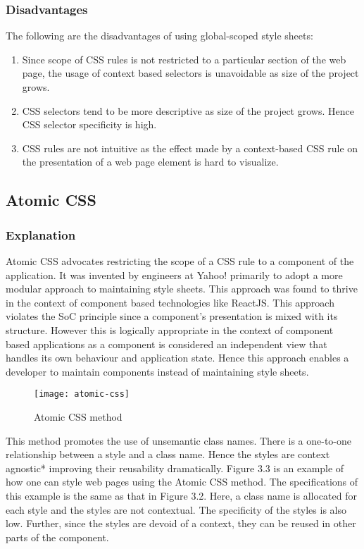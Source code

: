 \documentclass[12pt]{article}
\begin{document}
\subsubsection{Disadvantages}
The following are the disadvantages of using global-scoped style sheets:
\begin{enumerate}
	\item Since scope of CSS rules is not restricted to a particular section of the web page, the usage of context based selectors is unavoidable as size of the project grows.

	\item CSS selectors tend to be more descriptive as size of the project grows. Hence CSS selector specificity is high.

	\item CSS rules are not intuitive as the effect made by a context-based CSS rule on the presentation of a web page element is hard to visualize.
\end{enumerate}

\subsection{Atomic CSS}
\subsubsection{Explanation}
Atomic CSS advocates restricting the scope of a CSS rule to a component of the application. It was invented by engineers at Yahoo! primarily to adopt a more modular approach to maintaining style sheets. This approach was found to thrive in the context of component based technologies like ReactJS. This approach violates the SoC principle since a component's presentation is mixed with its structure. However this is logically appropriate in the context of component based applications as a component is considered an independent view that handles its own behaviour and application state. Hence this approach enables a developer to maintain components instead of maintaining style sheets.

\vspace{0.5cm}

\begin{figure}[h]
\texttt{[image: atomic-css]}
\centering
\caption{Atomic CSS method}
\end{figure}

\vspace{0.5cm}

This method promotes the use of unsemantic class names. There is a one-to-one relationship between a style and a class name. Hence the styles are context agnostic* improving their reusability dramatically. Figure 3.3 is an example of how one can style web pages using the Atomic CSS method. The specifications of this example is the same as that in Figure 3.2. Here, a class name is allocated for each style and the styles are not contextual. The specificity of the styles is also low. Further, since the styles are devoid of a context, they can be reused in other parts of the component.
\end{document}
